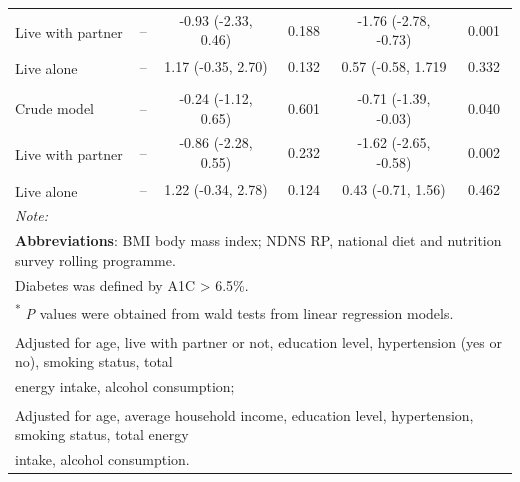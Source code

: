 \begin{table}[H]
\begin{tabular}[t]{lccccc}
		\hspace{1em}\hspace{1em}Live with partner\textsuperscript{\ddag} & -- & -0.93 (-2.33, 0.46) & 0.188 & -1.76 (-2.78, -0.73) & 0.001\\
		\hspace{1em}\hspace{1em}Live alone\textsuperscript{\ddag} & -- & 1.17 (-0.35, 2.70) & 0.132 & 0.57 (-0.58, 1.719 & 0.332\\
		\addlinespace[0.3em]
		\multicolumn{6}{l}{\hspace{1em}\textbf{BMI in non-diabetics}}\\
		\hspace{1em}\hspace{1em}Crude model & -- & -0.24 (-1.12, 0.65) & 0.601 & -0.71 (-1.39, -0.03) & 0.040\\
		\hspace{1em}\hspace{1em}Live with partner\textsuperscript{\ddag} & -- & -0.86 (-2.28, 0.55) & 0.232 & -1.62 (-2.65, -0.58) & 0.002\\
		\hspace{1em}\hspace{1em}Live alone\textsuperscript{\ddag} & -- & 1.22 (-0.34, 2.78) & 0.124 & 0.43 (-0.71, 1.56) & 0.462\\
    	\bottomrule
		\multicolumn{6}{l}{{\scriptsize \textit{Note: }}}\\
		\multicolumn{6}{l}{{\scriptsize \textbf{Abbreviations}: BMI body mass index; NDNS RP, national diet and nutrition survey rolling programme.}}\\
		\multicolumn{6}{l}{{\scriptsize Diabetes was defined by A1C > 6.5\%.}}\\
		\multicolumn{6}{l}{{\scriptsize \textsuperscript{*} \textit{P} values were obtained from wald tests from linear regression models.}}\\
		\multicolumn{6}{l}{{\scriptsize \textsuperscript{\dag} Adjusted for age, live with partner or not, education level, hypertension (yes or no), smoking status, total }}\\
		\multicolumn{6}{l}{{\scriptsize  energy intake, alcohol consumption;}}\\
		\multicolumn{6}{l}{{\scriptsize \textsuperscript{\ddag} Adjusted for age, average household income, education level, hypertension, smoking status, total energy}}\\ 
		\multicolumn{6}{l}{{\scriptsize  intake, alcohol consumption.}}\\
	\end{tabular}
\end{table}

